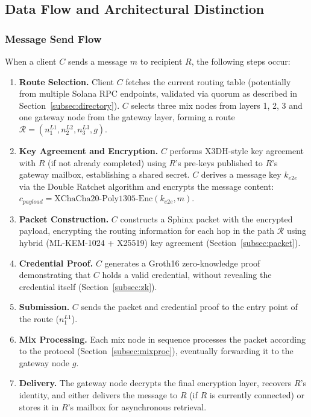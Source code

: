 \documentclass[11pt]{article}
\theoremstyle{definition}
\theoremstyle{remark}
\begin{document}
\subsection{Data Flow and Architectural Distinction}

\subsubsection{Message Send Flow}

When a client $C$ sends a message $m$ to recipient $R$, the following steps occur:

\begin{enumerate}
    \item \textbf{Route Selection.} Client $C$ fetches the current routing table (potentially from multiple Solana RPC endpoints, validated via quorum as described in Section~\ref{subsec:directory}). $C$ selects three mix nodes from layers 1, 2, 3 and one gateway node from the gateway layer, forming a route $\mathcal{R} = (n_1^{L1}, n_2^{L2}, n_3^{L3}, g)$.

    \item \textbf{Key Agreement and Encryption.} $C$ performs X3DH-style key agreement with $R$ (if not already completed) using $R$'s pre-keys published to $R$'s gateway mailbox, establishing a shared secret. $C$ derives a message key $k_{e2e}$ via the Double Ratchet algorithm and encrypts the message content: $c_{payload} = \text{XChaCha20-Poly1305-Enc}(k_{e2e}, m)$.

    \item \textbf{Packet Construction.} $C$ constructs a Sphinx packet with the encrypted payload, encrypting the routing information for each hop in the path $\mathcal{R}$ using hybrid (ML-KEM-1024 + X25519) key agreement (Section~\ref{subsec:packet}).

    \item \textbf{Credential Proof.} $C$ generates a Groth16 zero-knowledge proof demonstrating that $C$ holds a valid credential, without revealing the credential itself (Section~\ref{subsec:zk}).

    \item \textbf{Submission.} $C$ sends the packet and credential proof to the entry point of the route ($n_1^{L1}$).

    \item \textbf{Mix Processing.} Each mix node in sequence processes the packet according to the protocol (Section~\ref{subsec:mixproc}), eventually forwarding it to the gateway node $g$.

    \item \textbf{Delivery.} The gateway node decrypts the final encryption layer, recovers $R$'s identity, and either delivers the message to $R$ (if $R$ is currently connected) or stores it in $R$'s mailbox for asynchronous retrieval.
\end{enumerate}
\end{document}
